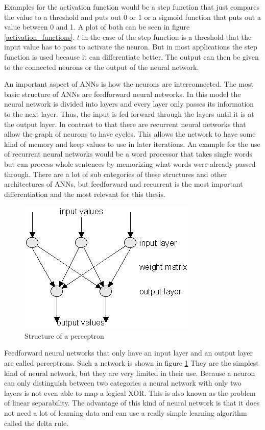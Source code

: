 Examples for the activation function would be a step function that just compares the value to a threshold and puts out 0 or 1 or a sigmoid function that puts out a value between 0 and 1. A plot of both can be seen in figure \ref{activation_functions}. $t$ in the case of the step function is a threshold that the input value has to pass to activate the neuron. But in most applications the step function is used because it can differentiate better. The output can then be given to the connected neurons or the output of the neural network.

An important aspect of ANNs is how the neurons are interconnected. The most basic structure of ANNs are feedforward neural networks. In this model the neural network is divided into layers and every layer only passes its information to the next layer. Thus, the input is fed forward through the layers until it is at the output layer. In contrast to that there are recurrent neural networks that allow the graph of neurons to have cycles. This allows the network to have some kind of memory and keep values to use in later iterations. An example for the use of recurrent neural networks would be a word processor that takes single words but can process whole sentences by memorizing what words were already passed through. There are a lot of sub categories of these structures and other architectures of ANNs, but feedforward and recurrent is the most important differentiation and the most relevant for this thesis.

\begin{figure}[ht]
	\centering
  \includegraphics[scale=0.9]{figures/perceptron.png}
	\caption[Structure of a perceptron]{Structure of a perceptron \protect\footnotemark}
	\label{perceptron}
\end{figure}

Feedforward neural networks that only have an input layer and an output layer are called perceptrons. Such a network is shown in figure \ref{perceptron} They are the simplest kind of neural network, but they are very limited in their use. Because a neuron can only distinguish between two categories a neural network with only two layers is not even able to map a logical XOR. This is also known as the problem of linear separability. The advantage of this kind of neural network is that it does not need a lot of learning data and can use a really simple learning algorithm called the delta rule.

